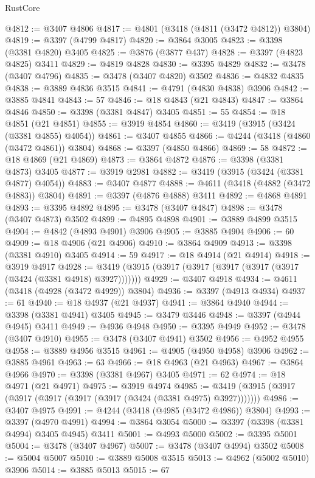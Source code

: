\begin{lexlean}{RustCore}
\begin{coremodule}
@4812 := @3407 @4806
@4817 := @4801 (@3418 (@4811 (@3472 @4812)) @3804)
@4819 := @3397 (@4799 @4817)
@4820 := @3864 @3005
@4823 := @3398 (@3381 @4820) @3405
@4825 := @3876 (@3877 @437)
@4828 := @3397 (@4823 @4825) @3411
@4829 := @4819 @4828
@4830 := @3395 @4829
@4832 := @3478 (@3407 @4796)
@4835 := @3478 (@3407 @4820) @3502
@4836 := @4832 @4835
@4838 := @3889 @4836 @3515
@4841 := @4791 (@4830 @4838) @3906
@4842 := @3885 @4841
@4843 := 57
@4846 := @18 @4843 (@21 @4843)
@4847 := @3864 @4846
@4850 := @3398 (@3381 @4847) @3405
@4851 := 55
@4854 := @18 @4851 (@21 @4851)
@4855 := @3919 @4854
@4860 := @3419 (@3915 (@3424 (@3381 @4855) @4054))
@4861 := @3407 @4855
@4866 := @4244 (@3418 (@4860 (@3472 @4861)) @3804)
@4868 := @3397 (@4850 @4866)
@4869 := 58
@4872 := @18 @4869 (@21 @4869)
@4873 := @3864 @4872
@4876 := @3398 (@3381 @4873) @3405
@4877 := @3919 @2981
@4882 := @3419 (@3915 (@3424 (@3381 @4877) @4054))
@4883 := @3407 @4877
@4888 := @4611 (@3418 (@4882 (@3472 @4883)) @3804)
@4891 := @3397 (@4876 @4888) @3411
@4892 := @4868 @4891
@4893 := @3395 @4892
@4895 := @3478 (@3407 @4847)
@4898 := @3478 (@3407 @4873) @3502
@4899 := @4895 @4898
@4901 := @3889 @4899 @3515
@4904 := @4842 (@4893 @4901) @3906
@4905 := @3885 @4904
@4906 := 60
@4909 := @18 @4906 (@21 @4906)
@4910 := @3864 @4909
@4913 := @3398 (@3381 @4910) @3405
@4914 := 59
@4917 := @18 @4914 (@21 @4914)
@4918 := @3919 @4917
@4928 := @3419 (@3915 (@3917 (@3917 (@3917 (@3917 (@3917 (@3424 (@3381 @4918) @3927)))))))
@4929 := @3407 @4918
@4934 := @4611 (@3418 (@4928 (@3472 @4929)) @3804)
@4936 := @3397 (@4913 @4934)
@4937 := 61
@4940 := @18 @4937 (@21 @4937)
@4941 := @3864 @4940
@4944 := @3398 (@3381 @4941) @3405
@4945 := @3479 @3446
@4948 := @3397 (@4944 @4945) @3411
@4949 := @4936 @4948
@4950 := @3395 @4949
@4952 := @3478 (@3407 @4910)
@4955 := @3478 (@3407 @4941) @3502
@4956 := @4952 @4955
@4958 := @3889 @4956 @3515
@4961 := @4905 (@4950 @4958) @3906
@4962 := @3885 @4961
@4963 := 63
@4966 := @18 @4963 (@21 @4963)
@4967 := @3864 @4966
@4970 := @3398 (@3381 @4967) @3405
@4971 := 62
@4974 := @18 @4971 (@21 @4971)
@4975 := @3919 @4974
@4985 := @3419 (@3915 (@3917 (@3917 (@3917 (@3917 (@3917 (@3424 (@3381 @4975) @3927)))))))
@4986 := @3407 @4975
@4991 := @4244 (@3418 (@4985 (@3472 @4986)) @3804)
@4993 := @3397 (@4970 @4991)
@4994 := @3864 @3054
@5000 := @3397 (@3398 (@3381 @4994) @3405 @4945) @3411
@5001 := @4993 @5000
@5002 := @3395 @5001
@5004 := @3478 (@3407 @4967)
@5007 := @3478 (@3407 @4994) @3502
@5008 := @5004 @5007
@5010 := @3889 @5008 @3515
@5013 := @4962 (@5002 @5010) @3906
@5014 := @3885 @5013
@5015 := 67

\end{coremodule}
\end{lexlean}

